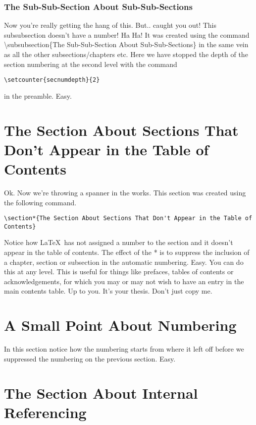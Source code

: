 \subsubsection{The Sub-Sub-Section About Sub-Sub-Sections}
\label{sec:SubSubSection}
Now you're really getting the hang of this. But.. caught you out! This subsubsection doesn't have a number!  Ha Ha! It was created using the command {\textbackslash}subsubsection\{The Sub-Sub-Section About Sub-Sub-Sections\} in the same vein as all the other subsections/chapters etc. Here we have stopped the depth of the section numbering at the second level with the command

\begin{verbatim}
\setcounter{secnumdepth}{2}
\end{verbatim}
in the preamble. Easy.

\pagebreak
\section*{The Section About Sections That Don't Appear in the Table of Contents}
\label{sec:InvisibleSection}
Ok. Now we're throwing a spanner in the works. This section was created using the following command.
\begin{verbatim}
\section*{The Section About Sections That Don't Appear in the Table of Contents}
\end{verbatim}
Notice how \LaTeX\ has not assigned a number to the section and it doesn't appear in the table of contents. The effect of the * is to suppress the inclusion of a chapter, section or subsection in the automatic numbering. Easy. You can do this at any level. This is useful for things like prefaces, tables of contents or acknowledgements, for which you may or may not wish to have an entry in the main contents table. Up to you. It's your thesis. Don't just copy me.

\section{A Small Point About Numbering}

In this section notice how the numbering starts from where it left off before we suppressed the numbering on the previous section. Easy.
\pagebreak

\section{The Section About Internal Referencing}
\label{sec:InternalReferencing}

